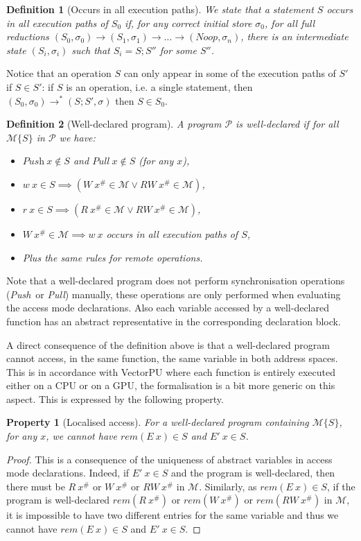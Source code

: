 \documentclass[preprint,12pt]{elsarticle}
\newcommand{\symb}[1]{\textit{#1}}
\newcommand{\noop}{\symb{Noop}}
\newcommand{\Push}{\symb{Push}}
\newcommand{\Pull}{\symb{Pull}}
\newcommand{\rem}[1]{\symb{rem}(#1)}
\newtheorem{definition}{Definition}
\newtheorem{Property}{Property}
\newcommand{\abs}[1]{#1^\#}
\newcommand{\AM}{\mathcal{M}}
\newcommand{\Prog}{\mathcal{P}}
\begin{document}
\begin{definition}[Occurs in all execution paths]
We state that a statement\emph{ $S$ occurs in all execution paths of $S_0$} if, for any 
correct 
initial store $\sigma_0$, for all full reductions 
$(S_0,\sigma_0)\to(S_1,\sigma_1)\to\ldots\to(\noop,\sigma_n)$, there is an intermediate 
state $(S_i,\sigma_i)$ such that $S_i=S;S''$ for some $S''$.
\end{definition}
Notice that an operation $S$ can only appear in some of the execution paths of $S'$ if  $S\in 
S'$: if $S$ is an operation, i.e. a single statement, then $(S_0,\sigma_0)\to^* (S;S',\sigma)$ then $S\in S_0$.


\begin{definition}[Well-declared program]\label{def-WD}
A program $\Prog$ is \emph{well-declared} if for all $\AM\{S\}$ in $\Prog$ we have:
\begin{itemize}
\item $\Push\ x\not\in S$ and $\Pull\ x\not \in S$ (for any $x$),
\item $w\ x\in S \implies (W\ \abs x \in \AM \lor RW\ \abs x \in \AM)$,
\item $r\ x\in S \implies (R\ \abs x \in \AM \lor RW\ \abs x \in \AM)$,
\item $W\ \abs x\!\in\! \AM \!\implies\! w\ x$ occurs in all execution paths of $S$,
\item Plus the same rules for remote operations.
\end{itemize}
\end{definition}
Note that a well-declared program does not perform synchronisation 
operations (\Push\ or \Pull) manually, these operations are only  performed when 
evaluating the 
access mode declarations. Also each variable accessed by a well-declared function has an 
abstract representative in the corresponding declaration block.


A direct consequence of the definition above is that a well-declared program cannot 
access, in the same function, the same
variable in both address spaces. This is in accordance with VectorPU where each function 
is entirely executed either on a CPU or on a GPU, the formalisation is a bit more 
 generic on this aspect. This is expressed by the following property.
\begin{Property}[Localised access]\label{prop-localised}
For a well-declared program containing $\AM\{S\}$, for any $x$, we cannot have $\rem {E\ 
x} \in S$ and $E'\ x \in S$.
\end{Property}
\begin{proof}
This is a consequence of the uniqueness of abstract variables in access mode declarations. Indeed, if $E'\ x\in S$ and the program is well-declared, then there must be $R\ \abs x$ or $W\ \abs x$ or $RW\ \abs x$ in $\AM$. Similarly, as $\rem {E\ x} \in S$, if the program is well-declared $\rem {R\ \abs x}$ or $\rem {W\ \abs x}$ or $\rem {RW\ \abs x}$ in $\AM$, it is impossible to have two different entries for the same variable and thus we cannot have $\rem {E\ 
x} \in S$ and $E'\ x \in S$.
\end{proof}
\end{document}
